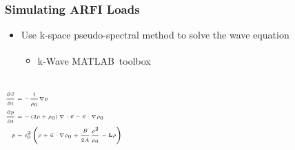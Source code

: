 \documentclass{beamer}
\begin{document}
		\begin{frame}
			\frametitle{Simulating ARFI Loads}
			\vspace{0.75cm}
			\begin{itemize}
				\item Use k-space pseudo-spectral method to solve the wave equation
				\begin{itemize}
					\item k-Wave MATLAB\textsuperscript{\textregistered}\ toolbox
				\end{itemize}
			\end{itemize}
			\vspace{-0.75cm}
			\begin{columns}[c]
					\begin{subequations}
						\tiny
						\label{equ:arfi_gov}
						\begin{align*}
							\frac{\partial \vec{v}}{\partial t} &= - \frac{1}{\rho_0} \nabla p \\
							\frac{\partial p}{\partial t} &= -\left(2 \rho + \rho_0\right)\nabla \cdot \vec{v} - \vec{v} \cdot \nabla \rho_0 \\
							p &= c_0^2 \left(\rho + \vec{u} \cdot \nabla \rho_0 + \frac{B}{2A} \frac{\rho^2}{\rho_0} - \mathbf{L}\rho \right)
						\end{align*}
					\end{subequations}


\end{columns}
\end{frame}
\end{document}
